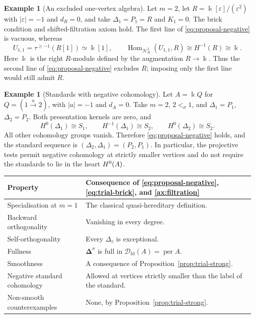 \documentclass[11pt,a4paper]{article}
\newcommand{\D}{\mathcal D}
\renewcommand{\H}{\mathcal H}
\newcommand{\std}{\Delta}
\DeclareMathOperator{\fd}{fd}
\DeclareMathOperator{\Hom}{Hom}
\DeclareMathOperator{\per}{per}
\let\mod\relax
\DeclareMathOperator{\mod}{mod}
\theoremstyle{plain}
\theoremstyle{definition}
\newtheorem{example}[theorem]{Example}
\numberwithin{equation}{section}
\begin{document}
\begin{example}[An excluded one-vertex algebra]
\label{ex:proposal-negative-dual-numbers}
Let $m=2$, let
$R=\Bbbk[\varepsilon]/(\varepsilon^2)$ with
$|\varepsilon|=-1$ and $d_R=0$, and take $\std_1=P_1=R$ and $K_1=0$.
The brick condition and shifted-filtration axiom hold. The first line
of \eqref{eq:proposal-negative} is vacuous, whereas
\[
 U_{1,1}=\tau^{\geq-1}(R[1])\simeq\Bbbk[1],\qquad
 \Hom_{\H_R^2}(U_{1,1},R)
 \cong H^{-1}(R)\cong\Bbbk.
\]
Here $\Bbbk$ is the right $R$-module defined by the augmentation
$R\to\Bbbk$. Thus the second line of
\eqref{eq:proposal-negative} excludes $R$; imposing only the first
line would still admit $R$.
\end{example}

\begin{example}[Standards with negative cohomology]
\label{ex:proposal-negative-graded-arrow}
Let $A=\Bbbk Q$ for $Q=(1\xrightarrow{a}2)$, with $|a|=-1$ and
$d_A=0$. Take $m=2$, $2<_\sigma1$, and
$\std_1=P_1$, $\std_2=P_2$. Both presentation kernels are zero, and
\[
 H^0(\std_1)\cong S_1,\qquad
 H^{-1}(\std_1)\cong S_2,\qquad
 H^0(\std_2)\cong S_2.
\]
All other cohomology groups vanish. Therefore
\eqref{eq:proposal-negative} holds, and the standard sequence is
$(\std_2,\std_1)=(P_2,P_1)$. In particular, the projective tests permit
negative cohomology at strictly smaller vertices and do not require
the standards to lie in the heart $\mod H^0(A)$.
\end{example}

\begin{center}\small
\begin{tabularx}{\linewidth}{@{}>{\raggedright\arraybackslash}p{.36\linewidth}>{\raggedright\arraybackslash}X@{}}
\toprule
Property & Consequence of \eqref{eq:proposal-negative},
\eqref{eq:trial-brick}, and \ref{ax:filtration}\\
\midrule
Specialisation at $m=1$ & The classical quasi-hereditary definition.\\
Backward orthogonality & Vanishing in every degree.\\
Self-orthogonality & Every $\std_v$ is exceptional.\\
Fullness & $\boldsymbol\std^\sigma$ is full in
$\D_{\fd}(A)=\per A$.\\
Smoothness & A consequence of Proposition~\ref{prop:trial-strong}.\\
Negative standard cohomology & Allowed at vertices strictly smaller
than the label of the standard.\\
Non-smooth counterexamples & None, by
Proposition~\ref{prop:trial-strong}.\\
\bottomrule
\end{tabularx}
\end{center}
\end{document}
